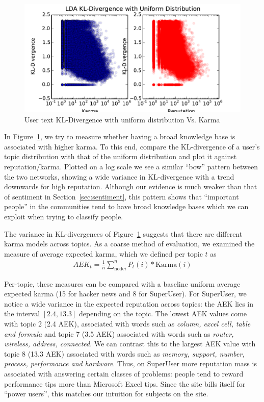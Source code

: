 \documentclass[11pt]{article}
\begin{document}
\begin{figure}[h]
\centering
\includegraphics[width=\linewidth]{lda_kl}
\caption{User text KL-Divergence with uniform distribution Vs. Karma}
\label{fig:lda_kl}
\end{figure}

In Figure~\ref{fig:lda_kl}, we try to measure whether having a broad knowledge
base is associated with higher karma. To this end, compare the KL-divergence of
a user's topic distribution with that of the uniform distribution and plot it
against reputation/karma. Plotted on a log scale we see a similar ``bow''
pattern between the two networks, showing a wide variance in KL-divergence 
with a trend downwards for high reputation. Although our evidence is much weaker
than that of sentiment in Section~\ref{sec:sentiment}, this pattern shows that
``important people'' in the communities tend to have broad knowledge bases which
we can exploit when trying to classify people.


The variance in KL-divergences of Figure~\ref{fig:lda_kl} suggests that there
are different karma models across topics. As a coarse method of evaluation, 
we examined the measure of average expected karma, which we defined per topic 
$t$ as
\begin{align*}
AEK_t = \frac{1}{n} \sum_{\text{node} i}^n P_t(i) * \text{Karma}(i)
\end{align*}

Per-topic, these measures can be compared with a baseline uniform average
expected karma (15 for hacker news and 8 for SuperUser). For SuperUser, we
notice a wide variance in the expected reputation across topics: the AEK lies in
the interval $[2.4, 13.3]$ depending on the topic. The lowest AEK values come
with topic 2 (2.4 AEK), associated with words such as \textit{column, excel cell, table
and formula} and topic 7 (3.5 AEK) associated with words such as \textit{router,
wireless, address, connected}. We can contrast this to the largest AEK value with topic 8
(13.3 AEK) associated with words such as \textit{memory, support, number,
process, performance and hardware}. Thus, on SuperUser more reputation mass is
associated with answering certain classes of problems: people tend to reward 
performance tips more than Microsoft Excel tips. Since the site bills itself for
``power users'', this matches our intuition for subjects on the site.
\end{document}
